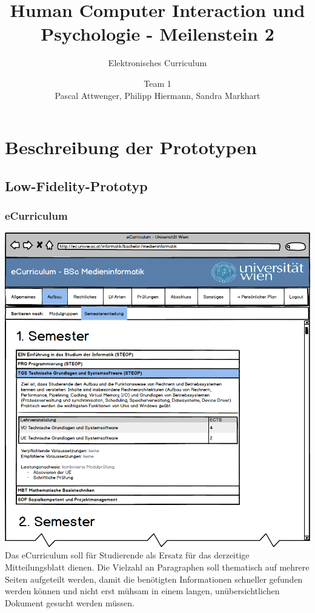 \documentclass[a4paper,10pt]{scrartcl}
\title{Human Computer Interaction und Psychologie - Meilenstein 2}
\subtitle{Elektronisches Curriculum}
\author{Team 1 \\Pascal Attwenger, Philipp Hiermann, Sandra Markhart}
\begin{document}
\maketitle

\section{Beschreibung der Prototypen}

\subsection{Low-Fidelity-Prototyp}

\subsubsection{eCurriculum}

 \includegraphics[scale=0.4]{./lowfi-curriculum.png}\\
 
Das eCurriculum soll für Studierende als Ersatz für das derzeitige Mitteilungsblatt dienen. Die Vielzahl an Paragraphen soll thematisch auf mehrere Seiten aufgeteilt werden, damit die benötigten Informationen schneller gefunden werden können und nicht erst mühsam in einem langen, unübersichtlichen Dokument gesucht werden müssen.
\end{document}
